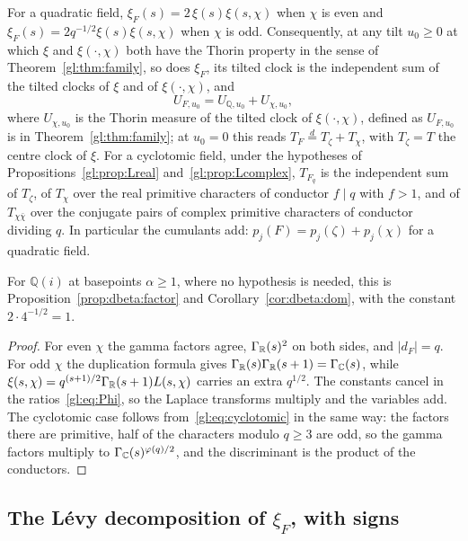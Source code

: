 \begin{proposition}\label{gl:prop:dedekind}
For a quadratic field, $\xi_F(s)=2\,\xi(s)\xi(s,\chi)$ when $\chi$ is even and $\xi_F(s)=2q^{-1/2}\xi(s)\xi(s,\chi)$ when $\chi$ is odd. Consequently, at any tilt $u_0\ge0$ at which $\xi$ and $\xi(\cdot,\chi)$ both have the Thorin property in the sense of Theorem~\ref{gl:thm:family}, so does $\xi_F$, its tilted clock is the independent sum of the tilted clocks of $\xi$ and of $\xi(\cdot,\chi)$, and
\[
U_{F,u_0}=U_{\mathbb Q,u_0}+U_{\chi,u_0},
\]
where $U_{\chi,u_0}$ is the Thorin measure of the tilted clock of $\xi(\cdot,\chi)$, defined as $U_{F,u_0}$ is in Theorem~\ref{gl:thm:family}; at $u_0=0$ this reads $T_F\stackrel d=T_\zeta+T_\chi$, with $T_\zeta=T$ the centre clock of $\xi$. For a cyclotomic field, under the hypotheses of Propositions~\ref{gl:prop:Lreal} and~\ref{gl:prop:Lcomplex}, $T_{F_q}$ is the independent sum of $T_\zeta$, of $T_\chi$ over the real primitive characters of conductor $f\mid q$ with $f>1$, and of $T_{\chi\bar\chi}$ over the conjugate pairs of complex primitive characters of conductor dividing $q$. In particular the cumulants add: $p_j(F)=p_j(\zeta)+p_j(\chi)$ for a quadratic field.
\end{proposition}

For $\mathbb Q(i)$ at basepoints $\alpha\ge1$, where no hypothesis is needed, this is Proposition~\ref{prop:dbeta:factor} and Corollary~\ref{cor:dbeta:dom}, with the constant $2\cdot4^{-1/2}=1$.

\begin{proof}
For even $\chi$ the gamma factors agree, $\Gamma_{\mathbb{R}}(s)^2$ on both sides, and $|d_F|=q$. For odd $\chi$ the duplication formula gives $\Gamma_{\mathbb{R}}(s)\Gamma_{\mathbb{R}}(s+1)=\Gamma_{\mathbb{C}}(s)$, while $\xi(s,\chi)=q^{(s+1)/2}\Gamma_{\mathbb{R}}(s+1)L(s,\chi)$ carries an extra $q^{1/2}$. The constants cancel in the ratios~\eqref{gl:eq:Phi}, so the Laplace transforms multiply and the variables add. The cyclotomic case follows from~\eqref{gl:eq:cyclotomic} in the same way: the factors there are primitive, half of the characters modulo $q\ge3$ are odd, so the gamma factors multiply to $\Gamma_{\mathbb{C}}(s)^{\varphi(q)/2}$, and the discriminant is the product of the conductors.
\end{proof}

\subsection{The L\'evy decomposition of \texorpdfstring{$\xi_F$}{xi F}, with signs}

